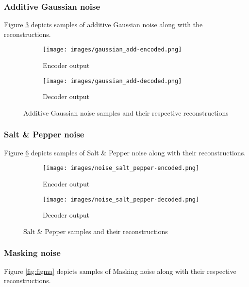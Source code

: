 \documentclass[10pt, a4paper]{article}
\begin{document}
    \subsubsection{Additive Gaussian noise}
    Figure \ref{fig:figag} depicts samples of additive Gaussian noise along with the reconstructions.
    
    \begin{figure}[h]
    \begin{subfigure}{0.2\textwidth}
    \texttt{[image: images/gaussian\_add-encoded.png]} 
    \caption{Encoder output}
    \label{fig:subim1}
    \end{subfigure}
    \begin{subfigure}{0.2\textwidth}
    \texttt{[image: images/gaussian\_add-decoded.png]}
    \caption{Decoder output}
    \label{fig:subim2}
    \end{subfigure}
    \caption{Additive Gaussian noise samples and their respective reconstructions}
    \label{fig:figag}
    \end{figure}
    
    \subsubsection{Salt \& Pepper noise}
    Figure \ref{fig:figsp} depicts samples of Salt \& Pepper noise along with their reconstructions.
    
    \begin{figure}[h]
    \begin{subfigure}{0.2\textwidth}
    \texttt{[image: images/noise\_salt\_pepper-encoded.png]} 
    \caption{Encoder output}
    \label{fig:subim1}
    \end{subfigure}
    \begin{subfigure}{0.2\textwidth}
    \texttt{[image: images/noise\_salt\_pepper-decoded.png]}
    \caption{Decoder output}
    \label{fig:subim2}
    \end{subfigure}
    \caption{Salt \& Pepper samples and their reconstructions}
    \label{fig:figsp}
    \end{figure}
    
    \subsubsection{Masking noise}
    Figure \ref{fig:figma} depicts samples of Masking noise along with their respective reconstructions.
    
\end{document}
